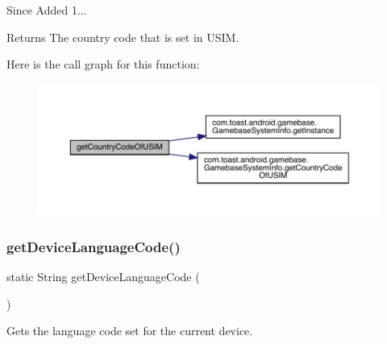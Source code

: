\begin{DoxySince}{Since}
Added 1... 
\end{DoxySince}
\begin{DoxyReturn}{Returns}
The country code that is set in U\+S\+IM. 
\end{DoxyReturn}
Here is the call graph for this function\+:
\nopagebreak
\begin{figure}[H]
\begin{center}
\leavevmode
\includegraphics[width=350pt]{classcom_1_1toast_1_1android_1_1gamebase_1_1_gamebase_aefed09bea0026a9e6de3c0506ebd5617_cgraph}
\end{center}
\end{figure}
\mbox{\label{classcom_1_1toast_1_1android_1_1gamebase_1_1_gamebase_a9816db7baf613297601e327207cda02d}} 
\subsubsection{\texorpdfstring{get\+Device\+Language\+Code()}{getDeviceLanguageCode()}}
{\footnotesize\ttfamily static String get\+Device\+Language\+Code (\begin{DoxyParamCaption}{ }\end{DoxyParamCaption})\hspace{0.3cm}{\ttfamily [static]}}



Gets the language code set for the current device. 


